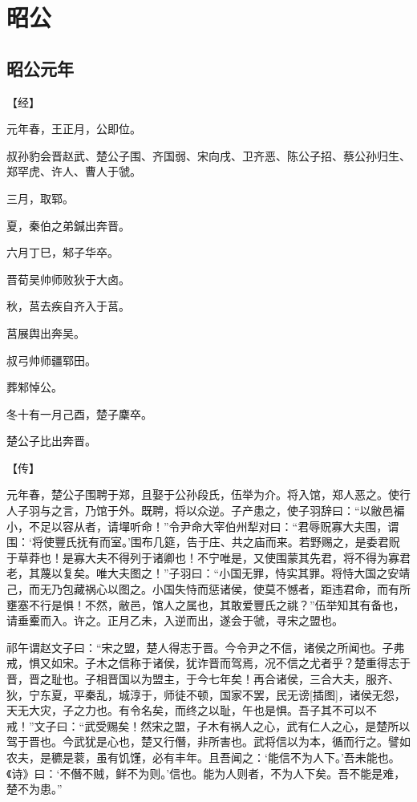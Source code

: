 \documentclass[a4paper,12pt,UTF8,twoside]{ctexbook}
\begin{document}
\chapter{昭公}

\section{昭公元年}



【经】

元年春，王正月，公即位。

叔孙豹会晋赵武、楚公子围、齐国弱、宋向戌、卫齐恶、陈公子招、蔡公孙归生、郑罕虎、许人、曹人于虢。

三月，取郓。

夏，秦伯之弟鍼出奔晋。

六月丁巳，邾子华卒。

晋荀吴帅师败狄于大卤。

秋，莒去疾自齐入于莒。

莒展舆出奔吴。

叔弓帅师疆郓田。

葬邾悼公。

冬十有一月己酉，楚子麇卒。

楚公子比出奔晋。

【传】

元年春，楚公子围聘于郑，且娶于公孙段氏，伍举为介。将入馆，郑人恶之。使行人子羽与之言，乃馆于外。既聘，将以众逆。子产患之，使子羽辞曰：“以敝邑褊小，不足以容从者，请墠听命！”令尹命大宰伯州犁对曰：“君辱贶寡大夫围，谓围：‘将使豐氏抚有而室。’围布几筵，告于庄、共之庙而来。若野赐之，是委君贶于草莽也！是寡大夫不得列于诸卿也！不宁唯是，又使围蒙其先君，将不得为寡君老，其蔑以复矣。唯大夫图之！”子羽曰：“小国无罪，恃实其罪。将恃大国之安靖己，而无乃包藏祸心以图之。小国失恃而惩诸侯，使莫不憾者，距违君命，而有所壅塞不行是惧！不然，敝邑，馆人之属也，其敢爱豐氏之祧？”伍举知其有备也，请垂櫜而入。许之。正月乙未，入逆而出，遂会于虢，寻宋之盟也。

祁午谓赵文子曰：“宋之盟，楚人得志于晋。今令尹之不信，诸侯之所闻也。子弗戒，惧又如宋。子木之信称于诸侯，犹诈晋而驾焉，况不信之尤者乎？楚重得志于晋，晋之耻也。子相晋国以为盟主，于今七年矣！再合诸侯，三合大夫，服齐、狄，宁东夏，平秦乱，城淳于，师徒不顿，国家不罢，民无谤[插图]，诸侯无怨，天无大灾，子之力也。有令名矣，而终之以耻，午也是惧。吾子其不可以不戒！”文子曰：“武受赐矣！然宋之盟，子木有祸人之心，武有仁人之心，是楚所以驾于晋也。今武犹是心也，楚又行僭，非所害也。武将信以为本，循而行之。譬如农夫，是穮是蓘，虽有饥馑，必有丰年。且吾闻之：‘能信不为人下。’吾未能也。《诗》曰：‘不僭不贼，鲜不为则。’信也。能为人则者，不为人下矣。吾不能是难，楚不为患。”
\end{document}
